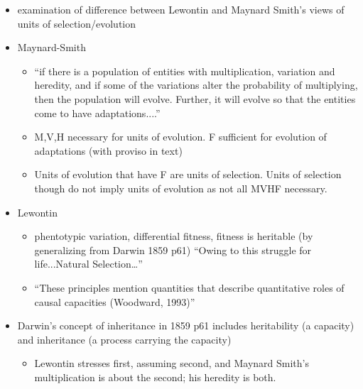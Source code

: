\autocite{Griesemer2001}
\begin{itemize}
	\item
	
	examination of difference between Lewontin and Maynard Smith's views
	of units of selection/evolution
	
	\item
	
	Maynard-Smith
	
	
	\begin{itemize}
		\item
		
		``if there is a population of entities with multiplication,
		variation and heredity, and if some of the variations alter the
		probability of multiplying, then the population will evolve.
		Further, it will evolve so that the entities come to have
		adaptations....''
		
		\item
		
		M,V,H necessary for units of evolution. F sufficient for evolution
		of adaptations (with proviso in text)
		
		\item
		
		Units of evolution that have F are units of selection. Units of
		selection though do not imply units of evolution as not all MVHF
		necessary.
		
	\end{itemize}
	\item
	
	Lewontin
	
	
	\begin{itemize}
		\item
		
		phentotypic variation, differential fitness, fitness is heritable
		(by generalizing from Darwin 1859 p61) ``Owing to this struggle for
		life...Natural Selection\ldots{}''
		
		\item
		
		``These principles mention quantities that describe quantitative
		roles of causal capacities (Woodward, 1993)''
		
	\end{itemize}
	\item
	
	Darwin's concept of inheritance in 1859 p61 includes heritability (a
	capacity) and inheritance (a process carrying the capacity)
	
	
	\begin{itemize}
		\item	
		Lewontin stresses first, assuming second, and Maynard Smith's
		multiplication is about the second; his heredity is both.
		
	\end{itemize}
\end{itemize}



